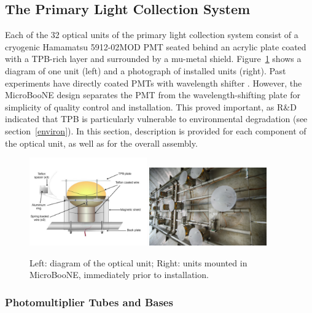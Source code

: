 \subsection{The Primary Light Collection System}

Each of the 32 optical units of the primary light collection system consist of a cryogenic Hamamatsu 5912-02MOD PMT seated behind an acrylic plate coated with a TPB-rich layer and surrounded by a mu-metal shield. 
Figure~\ref{fig:unitmounted} shows a diagram of one unit (left) and a photograph of installed units (right).  Past experiments have directly coated PMTs with wavelength shifter \cite{Amerio:2004-T600}.  However, 
the MicroBooNE design separates the PMT from the wavelength-shifting plate for simplicity of quality control and installation.  This proved important, as R\&D indicated that TPB is particularly vulnerable to environmental degradation (see section~\ref{environ}).  In this section, description is provided for each component of the optical unit, as well as for the overall assembly.

\begin{figure}
	\centering
           \includegraphics[width=0.45\textwidth]{./figures/PMTmount2.pdf} 
           \includegraphics[width=0.45\textwidth]{./figures/13-0430-05D.jpg} 
        \caption{Left: diagram of the optical unit; Right: units mounted in MicroBooNE, immediately prior to \lartpc installation.}\label{fig:unitmounted}
 
\end{figure}



\subsubsection{Photomultiplier Tubes and Bases}
\label{sec:pmt-bases}


